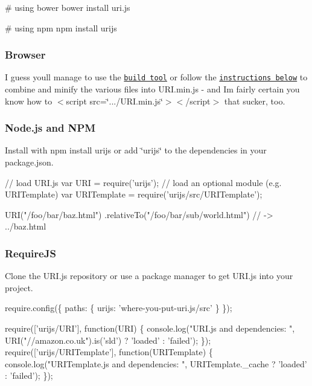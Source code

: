 \begin{DoxyCode}
# using bower
bower install uri.js

# using npm
npm install urijs
\end{DoxyCode}


\subsubsection*{Browser}

I guess you\textquotesingle{}ll manage to use the \href{http://medialize.github.io/URI.js/build.html}{\tt build tool} or follow the \href{#minify}{\tt instructions below} to combine and minify the various files into U\+R\+I.\+min.\+js -\/ and I\textquotesingle{}m fairly certain you know how to {\ttfamily $<$script src=\char`\"{}.../\+U\+R\+I.\+min.\+js\char`\"{}$>$$<$/script$>$} that sucker, too.

\subsubsection*{Node.\+js and N\+PM}

Install with {\ttfamily npm install urijs} or add {\ttfamily \char`\"{}urijs\char`\"{}} to the dependencies in your {\ttfamily package.\+json}.


\begin{DoxyCode}
// load URI.js
var URI = require('urijs');
// load an optional module (e.g. URITemplate)
var URITemplate = require('urijs/src/URITemplate');

URI("/foo/bar/baz.html")
  .relativeTo("/foo/bar/sub/world.html")
    // -> ../baz.html
\end{DoxyCode}


\subsubsection*{Require\+JS}

Clone the U\+R\+I.\+js repository or use a package manager to get U\+R\+I.\+js into your project.


\begin{DoxyCode}
require.config(\{
  paths: \{
    urijs: 'where-you-put-uri.js/src'
  \}
\});

require(['urijs/URI'], function(URI) \{
  console.log("URI.js and dependencies: ", URI("//amazon.co.uk").is('sld') ? 'loaded' : 'failed');
\});
require(['urijs/URITemplate'], function(URITemplate) \{
  console.log("URITemplate.js and dependencies: ", URITemplate.\_cache ? 'loaded' : 'failed');
\});
\end{DoxyCode}


